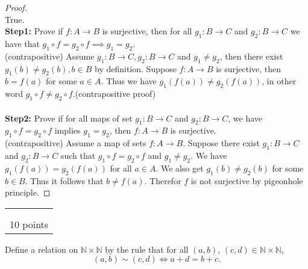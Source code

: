 \documentclass[addpoints]{exam}[14pt]
\newcounter{prb_num}
\newcounter{prb_num_a}
\newcommand{\prbbox}[1]
{
\stepcounter{prb_num}
\setcounter{prb_num_a}{0}
\vfill 
\begin{flushright}
\begin{tabular}{|l|} \hline 
\arabic{prb_num} \hskip .2in \ \\  \\ \hline
 #1\textnormal{  points}  \\
 \hline   \end{tabular} 
\end{flushright}
\newpage 
}
\begin{document}
\begin{questions}
\begin{proof}
\doublespacing
\ \\
True. \\
\textbf{Step1:} Prove if $ f: A \rightarrow B $ is surjective, then for all $ g_1: B \rightarrow C $ and $ g_2: B \rightarrow C $ we have that $ g_1 \circ f = g_2 \circ f \implies g_1 = g_2 $.\\
(contrapositive) Assume $ g_1 : B \rightarrow C, g_2 : B \rightarrow C $ and $ g_1 \neq g_2 $, then there exist $ g_1(b) \neq g_2(b), b \in B $ by definition. Suppose $ f: A \rightarrow B $ is surjective, then $ b = f(a) $ for some $ a \in A $. Thus we have $ g_1(f(a)) \neq g_2(f(a)) $, in other word $ g_1 \circ f \neq g_2 \circ f $.(contrapositive proof)\\ \\
\textbf{Step2:} Prove if for all maps of set $ g_1 : B \rightarrow C $ and $ g_2 : B \rightarrow C $, we have $ g_1 \circ f = g_2 \circ f $  implies $ g_1 = g_2 $, then $ f : A \rightarrow B $ is surjective. \\
(contrapositive) Assume a map of sets $ f : A \rightarrow B $. Suppose there exist $ g_1 : B \rightarrow C $ and $ g_2 : B \rightarrow C $ such that $ g_1 \circ f = g_2 \circ f $ and $ g_1 \neq g_2 $. We have $ g_1(f(a)) = g_2(f(a)) $ for all $ a \in A $. We also get $ g_1(b) \neq g_2(b) $ for some $ b \in B $. Thus it follows that $ b \neq f(a) $. Therefor $ f $ is not surjective by pigeonhole principle.

\end{proof}


\prbbox{10}





















\question   Define a relation on $\mathbb N\times \mathbb N$ by the rule that for all $(a,b)$, $(c,d) \in \mathbb N\times \mathbb N$, 
$$
(a,b)\sim (c,d)  \iff a+d=b+c.
$$ 


\end{questions}
\end{document}
